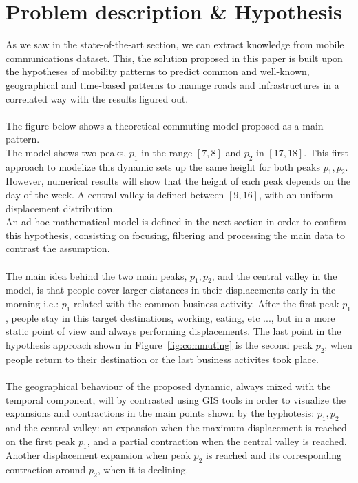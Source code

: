 \newpage

\section{Problem description \& Hypothesis}
As we saw in the state-of-the-art section, we can extract knowledge from mobile communications dataset. This, the solution proposed in this paper is built upon the hypotheses of mobility patterns to predict common and well-known, geographical and time-based patterns to manage roads and infrastructures in a correlated way with the results figured out.
\\
\\
The figure below shows a theoretical commuting model proposed as a main pattern. 
\\
The model shows two peaks, $p_1$ in the range $[7, 8]$ and $p_2$ in $[17, 18]$. This first approach to modelize this dynamic sets up the same height for both peaks $p_1, p_2$. However, numerical results will show that the height of each peak depends on the day of the week. A central valley is defined between $[9, 16]$, with an uniform displacement distribution.
\\
An ad-hoc mathematical model is defined in the next section in order to confirm this hypothesis, consisting on focusing, filtering and processing the main data to contrast the assumption.
\\
\\
The main idea behind the two main peaks, $p_1, p_2$, and the central valley in the model, is that people cover larger distances in their displacements early in the morning i.e.: $p_1$ related with the common business activity. After the first peak $p_1$, people stay in this target destinations, working, eating, etc ..., but in a more static point of view and always performing displacements. The last point in the hypothesis approach shown in Figure~\ref{fig:commuting} is the second peak $p_2$, when people return to their destination or the last business activites took place.
\\
\\
The geographical behaviour of the proposed dynamic, always mixed with the temporal component, will by contrasted using GIS tools in order to visualize the expansions and contractions in the main points shown by the hyphotesis: $p_1, p_2$ and the central valley: an expansion when the maximum displacement is reached on the first peak $p_1$, and a partial contraction when the central valley is reached. Another displacement expansion when peak $p_2$ is reached and its corresponding contraction around $p_2$, when it is declining.


